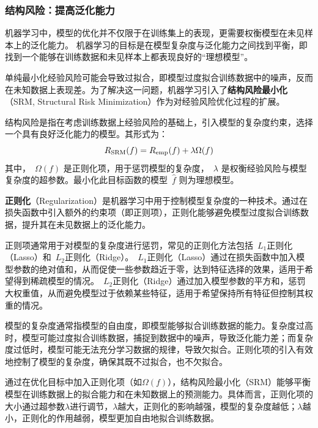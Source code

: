 \subsubsection{ 结构风险：提高泛化能力}

机器学习中，模型的优化并不仅限于在训练集上的表现，更需要权衡模型在未见样本上的泛化能力。
机器学习的目标是在模型复杂度与泛化能力之间找到平衡，即找到一个能够在训练数据和未见样本上都表现良好的“理想模型”。

单纯最小化经验风险可能会导致过拟合，即模型过度拟合训练数据中的噪声，反而在未知数据上表现差。为了解决这一问题，机器学习引入了{\bf 结构风险最小化}（SRM, Structural Risk Minimization）作为对经验风险优化过程的扩展。


\begin{definition}
结构风险是指在考虑训练数据上经验风险的基础上，引入模型的复杂度约束，选择一个具有良好泛化能力的模型。其形式为：
\begin{equation}\label{eq:SRM}
R_{\rm SRM}(f) = R_{\rm emp}(f) +\lambda \Omega(f)
\end{equation}
其中，~$\Omega(f)$ 是正则化项，用于惩罚模型的复杂度，~$\lambda$ 是权衡经验风险与模型复杂度的超参数。最小化此目标函数的模型~$\hat{f}$ 则为理想模型。 
\end{definition}

{\bf 正则化}（Regularization）是机器学习中用于控制模型复杂度的一种技术。通过在损失函数中引入额外的约束项（即正则项），正则化能够避免模型过度拟合训练数据，提升其在未见数据上的泛化能力。

正则项通常用于对模型的复杂度进行惩罚，常见的正则化方法包括~$L_1$正则化（Lasso）和~$L_2$正则化（Ridge）。~$L_1$正则化（Lasso）通过在损失函数中加入模型参数的绝对值和，从而促使一些参数趋近于零，达到特征选择的效果，适用于希望得到稀疏模型的情况。~$L_2$正则化（Ridge）通过加入模型参数的平方和，惩罚大权重值，从而避免模型过于依赖某些特征，适用于希望保持所有特征但控制其权重的情况。

模型的复杂度通常指模型的自由度，即模型能够拟合训练数据的能力。复杂度过高时，模型可能过度拟合训练数据，捕捉到数据中的噪声，导致泛化能力差；而复杂度过低时，模型可能无法充分学习数据的规律，导致欠拟合。正则化项的引入有效地控制了模型的复杂度，确保其既不过拟合，也不欠拟合。

通过在优化目标中加入正则化项（如$ \Omega(f) $），结构风险最小化（SRM）能够平衡模型在训练数据上的拟合能力和在未知数据上的预测能力。具体而言，正则化项的大小通过超参数$\lambda$进行调节，$\lambda$越大，正则化的影响越强，模型的复杂度越低；$\lambda$越小，正则化的作用越弱，模型更加自由地拟合训练数据。

